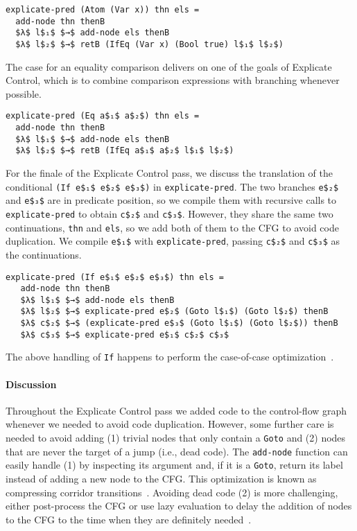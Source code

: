 \documentclass[sigplan,review,dvipsnames,screen,10pt]{acmart}
\begin{document}
\begin{lstlisting}
explicate-pred (Atom (Var x)) thn els =
  add-node thn thenB
  $λ$ l$₁$ $→$ add-node els thenB
  $λ$ l$₂$ $→$ retB (IfEq (Var x) (Bool true) l$₁$ l$₂$)
\end{lstlisting}

\noindent The case for an equality comparison delivers on one of the
goals of Explicate Control, which is to combine comparison expressions
with branching whenever possible.

\begin{lstlisting}
explicate-pred (Eq a$₁$ a$₂$) thn els =
  add-node thn thenB
  $λ$ l$₁$ $→$ add-node els thenB
  $λ$ l$₂$ $→$ retB (IfEq a$₁$ a$₂$ l$₁$ l$₂$)
\end{lstlisting}

For the finale of the Explicate Control pass, we discuss the
translation of the conditional \lstinline{(If e$₁$ e$₂$ e$₃$)}
in \lstinline{explicate-pred}.  The two
branches \lstinline{e$₂$} and \lstinline{e$₃$} are in predicate
position, so we compile them with recursive calls to
\lstinline{explicate-pred} to obtain \lstinline{c$₂$} and
\lstinline{c$₃$}. However, they share the same two continuations,
\lstinline{thn} and \lstinline{els}, so we add both of them to the CFG
to avoid code duplication. We compile \lstinline{e$₁$} with
\lstinline{explicate-pred}, passing \lstinline{c$₂$} and
\lstinline{c$₃$} as the continuations.

\begin{lstlisting}
explicate-pred (If e$₁$ e$₂$ e$₃$) thn els =
   add-node thn thenB
   $λ$ l$₁$ $→$ add-node els thenB
   $λ$ l$₂$ $→$ explicate-pred e$₂$ (Goto l$₁$) (Goto l$₂$) thenB
   $λ$ c$₂$ $→$ (explicate-pred e$₃$ (Goto l$₁$) (Goto l$₂$)) thenB
   $λ$ c$₃$ $→$ explicate-pred e$₁$ c$₂$ c$₃$
\end{lstlisting}

\noindent The above handling of \lstinline{If} happens to perform the
case-of-case optimization~\citep{PEYTONJONES19983}.

\paragraph{Discussion}

Throughout the Explicate Control pass we added code to the
control-flow graph whenever we needed to avoid code
duplication. However, some further care is needed to avoid adding (1)
trivial nodes that only contain a \lstinline{Goto} and (2) nodes that
are never the target of a jump (i.e., dead code). The
\lstinline{add-node} function can easily handle (1) by inspecting its
argument and, if it is a \lstinline{Goto}, return its label instead of
adding a new node to the CFG. This optimization is known as
compressing corridor transitions~\citep{Danvy:2009aa}.  Avoiding dead
code (2) is more challenging, either post-process the CFG or use lazy
evaluation to delay the addition of nodes to the CFG to the time when
they are definitely needed~\citep{Siek:2023tr}.
\end{document}
